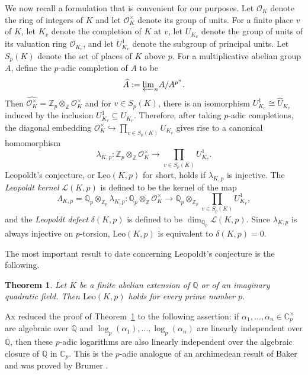 \documentclass[12pt]{amsart}
\theoremstyle{plain}
\newtheorem{theorem}{Theorem}[section]
\theoremstyle{remark}
\theoremstyle{definition}
\newcommand{\Z}{\mathbb{Z}}
\newcommand{\Q}{\mathbb{Q}}
\newcommand{\C}{\mathbb{C}}
\newcommand{\Leo}{\mathrm{Leo}}
\numberwithin{equation}{section}
\begin{document}
We now recall a formulation that is convenient for our purposes. 
Let $\mathcal{O}_{K}$ denote the ring of integers of $K$ and let $\mathcal{O}_{K}^{\times}$ denote
its group of units.
For a finite place $v$ of $K$, let $K_{v}$ denote the completion of $K$ at $v$,
let $U_{K_{v}}$ denote the group of units of its valuation ring $\mathcal{O}_{K_{v}}$,
and let $U_{K_{v}}^{1}$ denote the subgroup of principal units.
Let $S_{p}(K)$ denote the set of places of $K$ above $p$.
For a multiplicative abelian group $A$, define the $p$-adic completion of $A$ to be
\[
\widehat{A} := \textstyle{\varprojlim_{n}} A/A^{p^{n}}.
\]
Then $\widehat{\mathcal{O}_{K}^{\times}} = \Z_{p} \otimes_{\Z} \mathcal{O}_{K}^{\times}$
and for $v \in S_{p}(K)$, there is an isomorphism $U_{K_{v}}^{1} \cong \widehat{U}_{K_{v}}$
induced by the inclusion $U_{K_{v}}^{1} \subseteq U_{K_{v}}$.
Therefore, after taking $p$-adic completions, the diagonal embedding 
$\mathcal{O}_{K}^{\times} \hookrightarrow  \prod_{v \in S_{p}(K)} U_{K_{v}}$
gives rise to a canonical homomorphism
\[
\lambda_{K,p}: \Z_{p} \otimes_{\Z} \mathcal{O}_{K}^{\times} \longrightarrow \textstyle{\prod_{v \in S_{p}(K)}} U_{K_{v}}^{1}.
\]
Leopoldt's conjecture, or $\Leo(K,p)$ for short, holds if $\lambda_{K,p}$ is injective.
The \emph{Leopoldt kernel} $\mathcal{L}(K,p)$ is defined to be the kernel of the map
\[
\Lambda_{K,p} = \Q_{p} \otimes_{\Z_{p}} \lambda_{K,p} : \Q_{p} \otimes_{\Z} \mathcal{O}_{K}^{\times} \longrightarrow \Q_{p} \otimes_{\Z_{p}}\textstyle{\prod_{v \in S_{p}(K)}} U_{K_{v}}^{1},
\]
and the \emph{Leopoldt defect} $\delta(K,p)$ is defined to be $\dim_{\Q_{p}}\mathcal{L}(K,p)$.
Since $\lambda_{K,p}$ is always injective on $p$-torsion, $\Leo(K,p)$ is equivalent to 
$\delta(K,p)=0$.

The most important result to date concerning Leopoldt's conjecture is the following.

\begin{theorem}\cite{MR0181630,MR0220694}\label{thm:leo-abs-abelian}
Let $K$ be a finite abelian extension of $\Q$ or of an imaginary quadratic field. 
Then $\Leo(K,p)$ holds for every prime number $p$.
\end{theorem}

Ax \cite{MR0181630} reduced the proof of Theorem~\ref{thm:leo-abs-abelian} 
to the following assertion: if $\alpha_{1}, \ldots, \alpha_{n} \in \C_{p}^{\times}$
are algebraic over $\Q$ and $\log_{p}(\alpha_{1}), \ldots, \log_{p}(\alpha_{n})$
are linearly independent over $\Q$, then these $p$-adic logarithms are also linearly independent 
over the algebraic closure of $\Q$ in $\C_{p}$.
This is the $p$-adic analogue of an archimedean result of Baker \cite{MR220680}
and was proved by Brumer \cite{MR0220694}.
\end{document}
